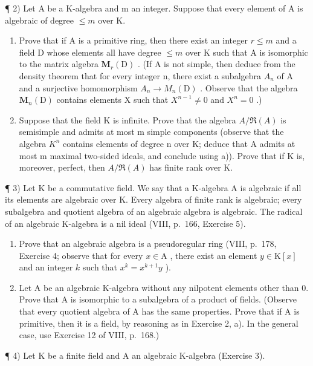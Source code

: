 ¶ 2) Let A be a K-algebra and m an integer. Suppose that every element of A is algebraic of degree \(\leqslant m\) over K.

\begin{enumerate}
\def\labelenumi{\alph{enumi})}
\item
  Prove that if A is a primitive ring, then there exist an integer \(r \leqslant m\) and a field D whose elements all have degree \(\leqslant m\) over K such that A is isomorphic to the matrix algebra \(\mathbf{M}_{r}(\mathrm{D})\) . (If A is not simple, then deduce from the density theorem that for every integer n, there exist a subalgebra \(A_{n}\) of A and a surjective homomorphism \(A_{n} \to M_{n}(\mathrm{D})\) . Observe that the algebra \(\mathbf{M}_{n}(\mathrm{D})\) contains elements X such that \(X^{n-1} \neq 0\) and \(X^{n} = 0\) .)
\item
  Suppose that the field K is infinite. Prove that the algebra \(A/\Re(A)\) is semisimple and admits at most m simple components (observe that the algebra \(K^{n}\) contains elements of degree n over K; deduce that A admits at most m maximal two-sided ideals, and conclude using a)). Prove that if K is, moreover, perfect, then \(A/\Re(A)\) has finite rank over K.
\end{enumerate}

¶ 3) Let K be a commutative field. We say that a K-algebra A is algebraic if all its elements are algebraic over K. Every algebra of finite rank is algebraic; every subalgebra and quotient algebra of an algebraic algebra is algebraic. The radical of an algebraic K-algebra is a nil ideal (VIII, p.~166, Exercise 5).

\begin{enumerate}
\def\labelenumi{\alph{enumi})}
\item
  Prove that an algebraic algebra is a pseudoregular ring (VIII, p.~178, Exercise 4; observe that for every \(x \in \mathrm{A}\) , there exist an element \(y \in \mathrm{K}[x]\) and an integer \(k\) such that \(x^k = x^{k+1}y\) ).
\item
  Let A be an algebraic K-algebra without any nilpotent elements other than 0. Prove that A is isomorphic to a subalgebra of a product of fields. (Observe that every quotient algebra of A has the same properties. Prove that if A is primitive, then it is a field, by reasoning as in Exercise 2, a). In the general case, use Exercise 12 of VIII, p.~168.)
\end{enumerate}

¶ 4) Let K be a finite field and A an algebraic K-algebra (Exercise 3).

